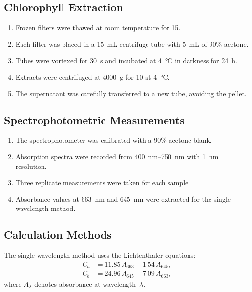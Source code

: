 \documentclass[
    language=english,
    doctype=article,
    institution=none,
    titlestyle=book,
]{../../omnilatex}
\begin{document}
\subsection{Chlorophyll Extraction}
\begin{enumerate}
    \item Frozen filters were thawed at room temperature for \SI{15}{\min}.
    \item Each filter was placed in a \SI{15}{\mL} centrifuge tube with
          \SI{5}{\mL} of 90\% acetone.
    \item Tubes were vortexed for \SI{30}{\s} and incubated at
          \SI{4}{\degreeCelsius} in darkness for \SI{24}{h}.
    \item Extracts were centrifuged at \SI{4000}{g} for \SI{10}{\min} at
          \SI{4}{\degreeCelsius}.
    \item The supernatant was carefully transferred to a new tube, avoiding
          the pellet.
\end{enumerate}

\subsection{Spectrophotometric Measurements}
\begin{enumerate}
    \item The spectrophotometer was calibrated with a 90\% acetone blank.
    \item Absorption spectra were recorded from \SIrange{400}{750}{\nm} with
          \SI{1}{\nm} resolution.
    \item Three replicate measurements were taken for each sample.
    \item Absorbance values at \SI{663}{\nm} and \SI{645}{\nm} were extracted
          for the single-wavelength method.
\end{enumerate}

\subsection{Calculation Methods}
The single-wavelength method uses the Lichtenthaler equations:
\begin{align}
    C_{a} &= 11.85\,A_{663} - 1.54\,A_{645},
    \label{eq:chla} \\
    C_{b} &= 24.96\,A_{645} - 7.09\,A_{663},
    \label{eq:chlb}
\end{align}
where $A_{\lambda}$ denotes absorbance at wavelength~$\lambda$.
\end{document}

